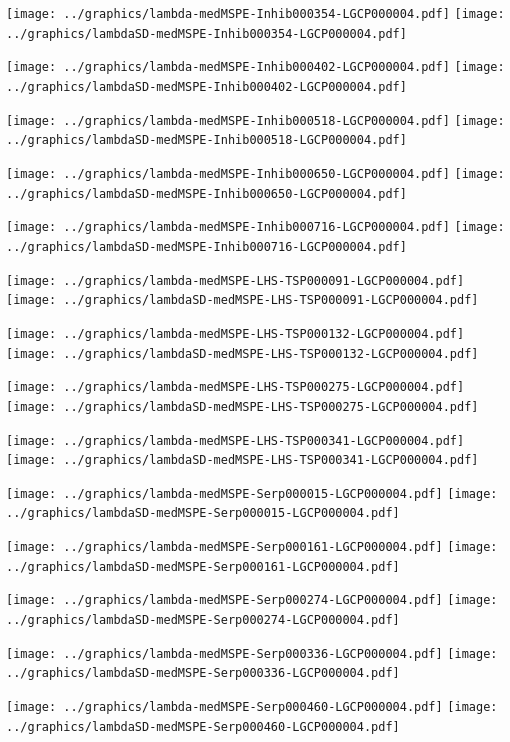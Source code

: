 \documentclass[review]{elsarticle}
\begin{document}
\texttt{[image: ../graphics/lambda-medMSPE-Inhib000354-LGCP000004.pdf]}
\texttt{[image: ../graphics/lambdaSD-medMSPE-Inhib000354-LGCP000004.pdf]}

\texttt{[image: ../graphics/lambda-medMSPE-Inhib000402-LGCP000004.pdf]}
\texttt{[image: ../graphics/lambdaSD-medMSPE-Inhib000402-LGCP000004.pdf]}

\texttt{[image: ../graphics/lambda-medMSPE-Inhib000518-LGCP000004.pdf]}
\texttt{[image: ../graphics/lambdaSD-medMSPE-Inhib000518-LGCP000004.pdf]}

\texttt{[image: ../graphics/lambda-medMSPE-Inhib000650-LGCP000004.pdf]}
\texttt{[image: ../graphics/lambdaSD-medMSPE-Inhib000650-LGCP000004.pdf]}

\texttt{[image: ../graphics/lambda-medMSPE-Inhib000716-LGCP000004.pdf]}
\texttt{[image: ../graphics/lambdaSD-medMSPE-Inhib000716-LGCP000004.pdf]}

\texttt{[image: ../graphics/lambda-medMSPE-LHS-TSP000091-LGCP000004.pdf]}
\texttt{[image: ../graphics/lambdaSD-medMSPE-LHS-TSP000091-LGCP000004.pdf]}

\texttt{[image: ../graphics/lambda-medMSPE-LHS-TSP000132-LGCP000004.pdf]}
\texttt{[image: ../graphics/lambdaSD-medMSPE-LHS-TSP000132-LGCP000004.pdf]}

\texttt{[image: ../graphics/lambda-medMSPE-LHS-TSP000275-LGCP000004.pdf]}
\texttt{[image: ../graphics/lambdaSD-medMSPE-LHS-TSP000275-LGCP000004.pdf]}

\texttt{[image: ../graphics/lambda-medMSPE-LHS-TSP000341-LGCP000004.pdf]}
\texttt{[image: ../graphics/lambdaSD-medMSPE-LHS-TSP000341-LGCP000004.pdf]}

\texttt{[image: ../graphics/lambda-medMSPE-Serp000015-LGCP000004.pdf]}
\texttt{[image: ../graphics/lambdaSD-medMSPE-Serp000015-LGCP000004.pdf]}

\texttt{[image: ../graphics/lambda-medMSPE-Serp000161-LGCP000004.pdf]}
\texttt{[image: ../graphics/lambdaSD-medMSPE-Serp000161-LGCP000004.pdf]}

\texttt{[image: ../graphics/lambda-medMSPE-Serp000274-LGCP000004.pdf]}
\texttt{[image: ../graphics/lambdaSD-medMSPE-Serp000274-LGCP000004.pdf]}

\texttt{[image: ../graphics/lambda-medMSPE-Serp000336-LGCP000004.pdf]}
\texttt{[image: ../graphics/lambdaSD-medMSPE-Serp000336-LGCP000004.pdf]}

\texttt{[image: ../graphics/lambda-medMSPE-Serp000460-LGCP000004.pdf]}
\texttt{[image: ../graphics/lambdaSD-medMSPE-Serp000460-LGCP000004.pdf]}
\end{document}
